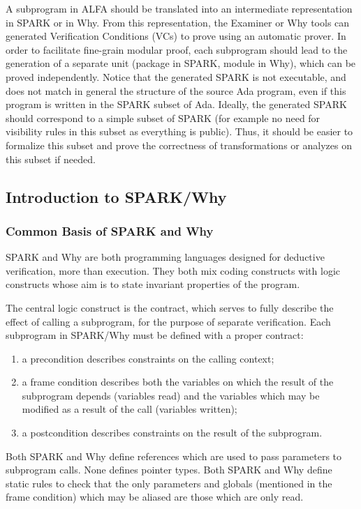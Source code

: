 \documentclass{article}
\newcounter{example}
\begin{document}
A subprogram in ALFA should be translated into an intermediate representation
in SPARK or in Why. From this representation, the Examiner or Why tools can
generated Verification Conditions (VCs) to prove using an automatic prover.  In
order to facilitate fine-grain modular proof, each subprogram should lead to
the generation of a separate unit (package in SPARK, module in Why), which can
be proved independently. Notice that the generated SPARK is not executable, and
does not match in general the structure of the source Ada program, even if this
program is written in the SPARK subset of Ada. Ideally, the generated SPARK
should correspond to a simple subset of SPARK (for example no need for
visibility rules in this subset as everything is public). Thus, it should be
easier to formalize this subset and prove the correctness of transformations or
analyzes on this subset if needed.

\subsection{Introduction to SPARK/Why}

\subsubsection{Common Basis of SPARK and Why}

SPARK and Why are both programming languages designed for deductive
verification, more than execution. They both mix coding constructs with logic
constructs whose aim is to state invariant properties of the program.

The central logic construct is the contract, which serves to fully describe the
effect of calling a subprogram, for the purpose of separate verification. Each
subprogram in SPARK/Why must be defined with a proper contract:
\begin{enumerate}
\item a precondition describes constraints on the calling context;
\item a frame condition describes both the variables on which the result of the
  subprogram depends (variables read) and the variables which may be modified
  as a result of the call (variables written);
\item a postcondition describes constraints on the result of the subprogram.
\end{enumerate}

Both SPARK and Why define references which are used to pass parameters to
subprogram calls. None defines pointer types. Both SPARK and Why define static
rules to check that the only parameters and globals (mentioned in the frame
condition) which may be aliased are those which are only read.
\end{document}
